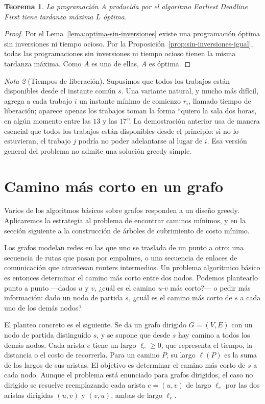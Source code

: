 \documentclass[12pt, spanish, oneside, openany]{book}
\theoremstyle{uprightplain}
\newtheorem{teorema}{Teorema}[section]
\theoremstyle{definition}
\theoremstyle{remark}
\newtheorem{nota}[teorema]{Nota}
\theoremstyle{definition}
\begin{document}
\begin{teorema}
\label{teo:edf-optimo}
La programación $A$ producida por el algoritmo Earliest Deadline First tiene tardanza máxima $L$ óptima.
\end{teorema}
\begin{proof}
Por el Lema~\ref{lema:optima-sin-inversiones} existe una programación óptima sin inversiones ni tiempo ocioso. Por la Proposición~\ref{prop:sin-inversiones-igual}, todas las programaciones sin inversiones ni tiempo ocioso tienen la misma tardanza máxima. Como $A$ es una de ellas, $A$ es óptima.
\end{proof}

\begin{nota}[Tiempos de liberación]
Supusimos que todos los trabajos están disponibles desde el instante común $s$. Una variante natural, y mucho más difícil, agrega a cada trabajo $i$ un instante mínimo de comienzo $r_i$, llamado tiempo de liberación; aparece apenas los trabajos toman la forma ``quiero la sala dos horas, en algún momento entre las $13$ y las $17$''. La demostración anterior usa de manera esencial que todos los trabajos están disponibles desde el principio: si no lo estuvieran, el trabajo $j$ podría no poder adelantarse al lugar de $i$. Esa versión general del problema no admite una solución greedy simple.
\end{nota}


\section{Camino más corto en un grafo}
\label{sec:dijkstra}

Varios de los algoritmos básicos sobre grafos responden a un diseño greedy. Aplicaremos la estrategia al problema de encontrar caminos mínimos, y en la sección siguiente a la construcción de árboles de cubrimiento de costo mínimo.

Los grafos modelan redes en las que uno se traslada de un punto a otro: una secuencia de rutas que pasan por empalmes, o una secuencia de enlaces de comunicación que atraviesan routers intermedios. Un problema algorítmico básico es entonces determinar el camino más corto entre dos nodos. Podemos plantearlo punto a punto ---dados $u$ y $v$, ¿cuál es el camino $u$-$v$ más corto?--- o pedir más información: dado un nodo de partida $s$, ¿cuál es el camino más corto de $s$ a cada uno de los demás nodos?

El planteo concreto es el siguiente. Se da un grafo dirigido $G=(V,E)$ con un nodo de partida distinguido $s$, y se supone que desde $s$ hay camino a todos los demás nodos. Cada arista $e$ tiene un largo $\ell_e \ge 0$, que representa el tiempo, la distancia o el costo de recorrerla. Para un camino $P$, su largo $\ell(P)$ es la suma de los largos de sus aristas. El objetivo es determinar el camino más corto de $s$ a cada nodo. Aunque el problema está enunciado para grafos dirigidos, el caso no dirigido se resuelve reemplazando cada arista $e=(u,v)$ de largo $\ell_e$ por las dos aristas dirigidas $(u,v)$ y $(v,u)$, ambas de largo $\ell_e$.
\end{document}
